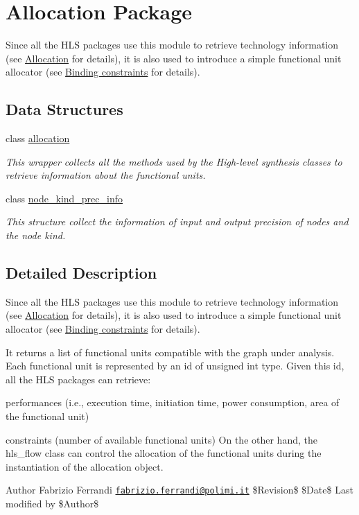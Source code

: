 \hypertarget{group__allocation}{}\section{Allocation Package}
\label{group__allocation}


Since all the H\+LS packages use this module to retrieve technology information (see \hyperlink{src_HLS_allocation_page}{Allocation} for details), it is also used to introduce a simple functional unit allocator (see \hyperlink{src_HLS_binding_constraints_page}{Binding constraints} for details).  


\subsection*{Data Structures}
\begin{DoxyCompactItemize}
\item 
class \hyperlink{classallocation}{allocation}
\begin{DoxyCompactList}\small\item\em This wrapper collects all the methods used by the High-\/level synthesis classes to retrieve information about the functional units. \end{DoxyCompactList}\item 
class \hyperlink{structnode__kind__prec__info}{node\+\_\+kind\+\_\+prec\+\_\+info}
\begin{DoxyCompactList}\small\item\em This structure collect the information of input and output precision of nodes and the node kind. \end{DoxyCompactList}\end{DoxyCompactItemize}


\subsection{Detailed Description}
Since all the H\+LS packages use this module to retrieve technology information (see \hyperlink{src_HLS_allocation_page}{Allocation} for details), it is also used to introduce a simple functional unit allocator (see \hyperlink{src_HLS_binding_constraints_page}{Binding constraints} for details). 

It returns a list of functional units compatible with the graph under analysis. Each functional unit is represented by an id of unsigned int type. Given this id, all the H\+LS packages can retrieve\+:
\begin{DoxyItemize}
\item performances (i.\+e., execution time, initiation time, power consumption, area of the functional unit)
\item constraints (number of available functional units) On the other hand, the hls\+\_\+flow class can control the allocation of the functional units during the instantiation of the allocation object.
\end{DoxyItemize}

\begin{DoxyAuthor}{Author}
Fabrizio Ferrandi \href{mailto:fabrizio.ferrandi@polimi.it}{\tt fabrizio.\+ferrandi@polimi.\+it} \$\+Revision\$ \$\+Date\$ Last modified by \$\+Author\$ 
\end{DoxyAuthor}
